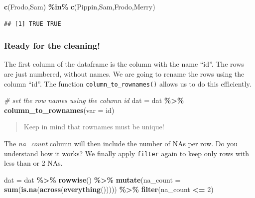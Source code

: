 \documentclass[
]{book}
\newenvironment{Shaded}{\begin{snugshade}}{\end{snugshade}}
\newcommand{\AttributeTok}[1]{\textcolor[rgb]{0.13,0.29,0.53}{#1}}
\newcommand{\CommentTok}[1]{\textcolor[rgb]{0.56,0.35,0.01}{\textit{#1}}}
\newcommand{\DecValTok}[1]{\textcolor[rgb]{0.00,0.00,0.81}{#1}}
\newcommand{\FunctionTok}[1]{\textcolor[rgb]{0.13,0.29,0.53}{\textbf{#1}}}
\newcommand{\NormalTok}[1]{#1}
\newcommand{\OtherTok}[1]{\textcolor[rgb]{0.56,0.35,0.01}{#1}}
\newcommand{\SpecialCharTok}[1]{\textcolor[rgb]{0.81,0.36,0.00}{\textbf{#1}}}
\newcommand{\StringTok}[1]{\textcolor[rgb]{0.31,0.60,0.02}{#1}}
\begin{document}
\begin{Shaded}
\begin{Highlighting}[]
\FunctionTok{c}\NormalTok{(}\StringTok{\textquotesingle{}Frodo\textquotesingle{}}\NormalTok{,}\StringTok{\textquotesingle{}Sam\textquotesingle{}}\NormalTok{) }\SpecialCharTok{\%in\%} \FunctionTok{c}\NormalTok{(}\StringTok{\textquotesingle{}Pippin\textquotesingle{}}\NormalTok{,}\StringTok{\textquotesingle{}Sam\textquotesingle{}}\NormalTok{,}\StringTok{\textquotesingle{}Frodo\textquotesingle{}}\NormalTok{,}\StringTok{\textquotesingle{}Merry\textquotesingle{}}\NormalTok{)}
\end{Highlighting}
\end{Shaded}

\begin{verbatim}
## [1] TRUE TRUE
\end{verbatim}

\hypertarget{ready-for-the-cleaning}{%
\subsubsection{Ready for the cleaning!}\label{ready-for-the-cleaning}}

The first column of the dataframe is the column with the name ``id''.
The rows are just numbered, without names.
We are going to rename the rows using the column ``id''. The function \texttt{column\_to\_rownames()} allows us to do this efficiently.

\begin{Shaded}
\begin{Highlighting}[]
\CommentTok{\# set the row names using the column id}
\NormalTok{dat }\OtherTok{=}\NormalTok{ dat }\SpecialCharTok{\%\textgreater{}\%}
  \FunctionTok{column\_to\_rownames}\NormalTok{(}\AttributeTok{var =} \StringTok{\textquotesingle{}id\textquotesingle{}}\NormalTok{)}
\end{Highlighting}
\end{Shaded}

\begin{quote}
Keep in mind that rownames must be unique!
\end{quote}

The \emph{na\_count} column will then include the number of NAs per row. Do you understand how it works?
We finally apply \texttt{filter} again to keep only rows with less than or 2 NAs.

\begin{Shaded}
\begin{Highlighting}[]
\NormalTok{dat }\OtherTok{=}\NormalTok{ dat }\SpecialCharTok{\%\textgreater{}\%}
  \FunctionTok{rowwise}\NormalTok{() }\SpecialCharTok{\%\textgreater{}\%}
  \FunctionTok{mutate}\NormalTok{(}\AttributeTok{na\_count =} \FunctionTok{sum}\NormalTok{(}\FunctionTok{is.na}\NormalTok{(}\FunctionTok{across}\NormalTok{(}\FunctionTok{everything}\NormalTok{())))) }\SpecialCharTok{\%\textgreater{}\%}
  \FunctionTok{filter}\NormalTok{(na\_count }\SpecialCharTok{\textless{}=} \DecValTok{2}\NormalTok{)}
\end{Highlighting}
\end{Shaded}
\end{document}

